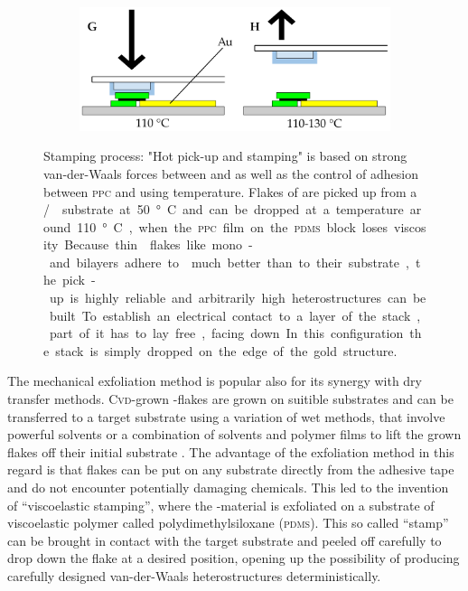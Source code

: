 \begin{figure}[t]
\begin{subfigure}{0.49\textwidth}
\end{subfigure}
\begin{subfigure}{0.49\textwidth}
	\includegraphics[width=\textwidth]{stamp_gh}
\end{subfigure}
\caption{Stamping process: "Hot pick-up and stamping" is based on strong van-der-Waals forces between \hbng and \tmds as well as the control of adhesion between \textsc{ppc} and \hbng using temperature. Flakes of \hbng are picked up from a \si/\sio substrate at 50 °C and can be dropped at a temperature around 110 °C, when the \textsc{ppc} film on the \textsc{pdms} block loses viscosity. Because thin \tmdg flakes like mono- and bilayers adhere to \hbng much better than to their substrate, the pick-up is highly reliable and arbitrarily high heterostructures can be built. To establish an electrical contact to a layer of the stack, part of it has to lay free, facing down. In this configuration the stack is simply dropped on the edge of the gold structure.}
	\label{stamping}
\end{figure}

The mechanical exfoliation method is popular also for its synergy with dry transfer methods. \textsc{Cvd}-grown \tmd-flakes are grown on suitible substrates and can be transferred to  a target substrate using a variation of wet methods, that involve powerful solvents or a combination of solvents and polymer films to lift the grown flakes off their initial substrate \cite{li_universal_2014}. The advantage of the exfoliation method in this regard is that flakes can be put on any substrate directly from the adhesive tape and do not encounter potentially damaging chemicals. This led to the invention of ``viscoelastic stamping'', where the \tmd-material is exfoliated on a substrate of viscoelastic polymer called polydimethylsiloxane (\textsc{pdms})\cite{castellanos-gomez_deterministic_2014}. This so called ``stamp'' can be brought in contact with the target substrate and peeled off carefully to drop down the flake at a desired position, opening up the possibility of producing carefully designed van-der-Waals heterostructures deterministically.

